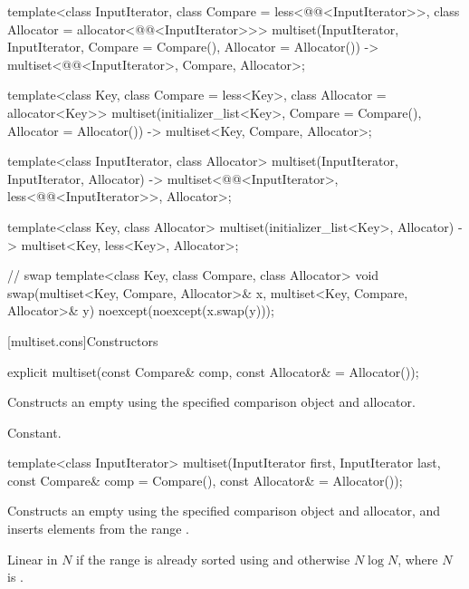 \begin{codeblock}
{  template<class InputIterator,
           class Compare = less<@@<InputIterator>>,
           class Allocator = allocator<@@<InputIterator>>>
    multiset(InputIterator, InputIterator,
             Compare = Compare(), Allocator = Allocator())
      -> multiset<@@<InputIterator>, Compare, Allocator>;

  template<class Key, class Compare = less<Key>, class Allocator = allocator<Key>>
    multiset(initializer_list<Key>, Compare = Compare(), Allocator = Allocator())
      -> multiset<Key, Compare, Allocator>;

  template<class InputIterator, class Allocator>
    multiset(InputIterator, InputIterator, Allocator)
      -> multiset<@@<InputIterator>,
                  less<@@<InputIterator>>, Allocator>;

  template<class Key, class Allocator>
    multiset(initializer_list<Key>, Allocator) -> multiset<Key, less<Key>, Allocator>;

  // swap
  template<class Key, class Compare, class Allocator>
    void swap(multiset<Key, Compare, Allocator>& x,
              multiset<Key, Compare, Allocator>& y)
      noexcept(noexcept(x.swap(y)));
}
\end{codeblock}%
%

[multiset.cons]{Constructors}

%
\begin{itemdecl}
explicit multiset(const Compare& comp, const Allocator& = Allocator());
\end{itemdecl}

\begin{itemdescr}
\pnum
\effects
Constructs an empty  using the specified comparison object and allocator.

\pnum
\complexity
Constant.
\end{itemdescr}

%
\begin{itemdecl}
template<class InputIterator>
  multiset(InputIterator first, InputIterator last,
           const Compare& comp = Compare(), const Allocator& = Allocator());
\end{itemdecl}

\begin{itemdescr}
\pnum
\effects
Constructs an empty
using the specified comparison object and allocator,
and inserts elements from the range
.

\pnum
\complexity
Linear in $N$
if the range
is already sorted using  and otherwise $N \log N$,
where $N$ is
.
\end{itemdescr}


